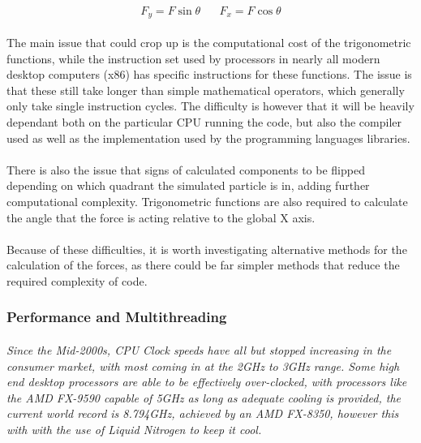 $$F_y=F\sin{\theta} \hspace{20pt} F_x=F\cos{\theta}$$

\paragraph{}
The main issue that could crop up is the computational cost of the trigonometric functions, while the instruction set used by processors in nearly all modern desktop computers (x86) has specific instructions for these functions.
The issue is that these still take longer than simple mathematical operators, which generally only take single instruction cycles. The difficulty is however that it will be heavily dependant both on the particular CPU running the code, but also the compiler used as well as the implementation used by the programming languages libraries.

\paragraph{}
There is also the issue that signs of calculated components to be flipped depending on which quadrant the simulated particle is in, adding further computational complexity. Trigonometric functions are also required to calculate the angle that the force is acting relative to the global X axis.

\paragraph{}
Because of these difficulties, it is worth investigating alternative methods for the calculation of the forces, as there could be far simpler methods that reduce the required complexity of code.

\subsubsection{Performance and Multithreading}

\paragraph{}
\textit{Since the Mid-2000s, CPU Clock speeds have all but stopped increasing in the consumer market, with most coming in at the 2GHz to 3GHz range. Some high end desktop processors are able to be effectively over-clocked, with processors like the AMD FX-9590 capable of 5GHz as long as adequate cooling is provided, the current world record is 8.794GHz, achieved by an AMD FX-8350, however this with with the use of Liquid Nitrogen to keep it cool.}

